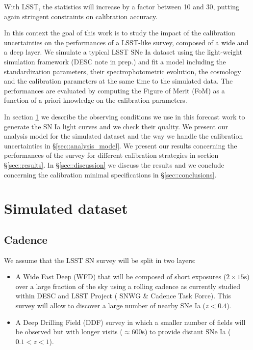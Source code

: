 \documentclass[\docopts]{\docclass}
\begin{document}
With LSST, the statistics will increase by a factor between 10 and 30, putting again stringent constraints on calibration accuracy.

In this context the goal of this work is to study the impact of the calibration uncertainties on the performances of a LSST-like survey, composed of a wide and a deep layer.
We simulate a typical LSST SNe Ia dataset using the light-weight simulation framework  (DESC note in prep.) and fit a model including the standardization parameters, their spectrophotometric evolution, the cosmology and the calibration parameters at the same time to the simulated data. The performances are evaluated by computing the Figure of Merit (FoM) as a function of a priori knowledge on the calibration parameters.

In section \ref{sec::simulated_dataset} we describe the observing conditions we use in this forecast work to generate the SN Ia light curves and we check their quality.
We present our analysis model for the simulated dataset and the way we handle the calibration uncertainties in §\ref{sec::analysis_model}.
We present our results concerning the performances of the survey for different calibration strategies in section §\ref{sec::results}.
In §\ref{sec::discussion} we discuss the results and we conclude concerning the calibration minimal specifications in §\ref{sec::conclusions}.


\section{Simulated dataset}
\label{sec::simulated_dataset}

\subsection{Cadence}
\label{subsec::cadence}

We assume that the LSST SN survey will be split in two layers:
\begin{itemize}
\item A Wide Fast Deep (WFD) that will be composed of short exposures ($2 \times 15\mathrm{s}$) over a large fraction of the sky using a rolling cadence as currently studied within DESC and LSST Project ( SNWG \& Cadence Task Force).
  This survey will allow to discover a large number of nearby SNe Ia ($z < 0.4$).
\item A Deep Drilling Field  (DDF) survey in which a smaller number of fields will be observed but with longer visits ($\approx \mathrm{600s}$) to provide distant SNe Ia ($ 0.1 < z < 1$).
\end{itemize}
\end{document}
